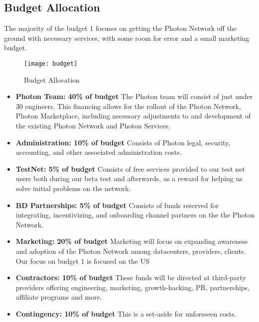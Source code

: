 \subsection{Budget Allocation}
The majority of the budget 1 focuses on getting the Photon Network off the ground with necessary services, with some room for error and a small marketing budget.    

\begin{figure}[htp]
\centering
  \texttt{[image: budget]}
  \caption{Budget Allocation}
\end{figure}                                                                          

\begin{itemize}
	\item \textbf{Photon Team: 40\% of budget} The Photon team will consist of just under 30 engineers. This financing allows for the rollout of the Photon Network, Photon Marketplace, including necessary adjustments to and development of the existing Photon Network and Photon Services. 
	\item \textbf{Administration: 10\% of budget} Consists of Photon legal, security, accounting, and other associated administration costs.
	\item \textbf{TestNet: 5\% of budget} Consists of free services provided to our test net users both during our beta test and afterwards, as a reward for helping us solve initial problems on the network.
	\item \textbf{BD Partnerships: 5\% of budget} Consists of funds reserved for integrating, incentivizing, and onboarding channel partners on the the Photon Network.
	\item \textbf{Marketing: 20\% of budget} Marketing will focus on expanding awareness and adoption of the Photon Network among datacenters, providers, clients. Our focus on budget 1 is focused on the US 
	\item \textbf{Contractors: 10\% of budget} These funds will be directed at third-party providers offering engineering, marketing, growth-hacking, PR, partnerships, affiliate programs and more.
	\item \textbf{Contingency: 10\% of budget} This is a set-aside for unforeseen costs.
\end{itemize}	